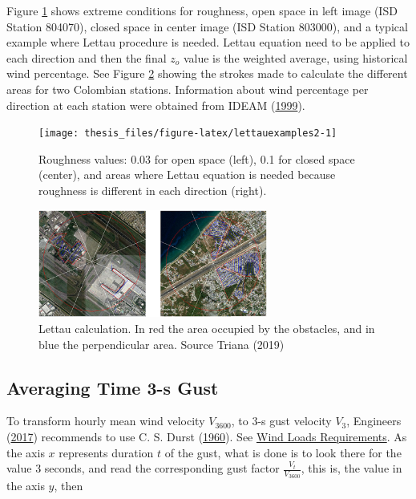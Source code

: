 \documentclass[12pt,oneside]{reedthesis}
\begin{document}
Figure \ref{fig:lettauexamples2} shows extreme conditions for roughness, open space in left image (ISD Station 804070), closed space in center image (ISD Station 803000), and a typical example where Lettau procedure is needed. Lettau equation need to be applied to each direction and then the final \(z_o\) value is the weighted average, using historical wind percentage. See Figure \ref{fig:lettauvalues} showing the strokes made to calculate the different areas for two Colombian stations. Information about wind percentage per direction at each station were obtained from IDEAM (\protect\hyperlink{ref-ideam1999}{1999}).
\begin{figure}

{\centering \texttt{[image: thesis\_files/figure-latex/lettauexamples2-1]} 

}

\caption{Roughness values: 0.03 for open space (left), 0.1 for closed space (center), and areas where Lettau equation is needed because roughness is different in each direction (right).}\label{fig:lettauexamples2}
\end{figure}
\begin{figure}

{\centering \includegraphics[width=2.97in]{figure/lettauvalues} 

}

\caption{Lettau calculation. In red the area occupied by the obstacles, and in blue the perpendicular area. Source Triana (2019)}\label{fig:lettauvalues}
\end{figure}
\hypertarget{rmd-gust}{%
\subsection{Averaging Time 3-s Gust}\label{rmd-gust}}

To transform hourly mean wind velocity \(V_{3600}\), to 3-s gust velocity \(V_3\), Engineers (\protect\hyperlink{ref-Asce2017}{2017}) recommends to use C. S. Durst (\protect\hyperlink{ref-Durst1960}{1960}). See \protect\hyperlink{windloadsrequirements}{Wind Loads Requirements}. As the axis \(x\) represents duration \(t\) of the gust, what is done is to look there for the value 3 seconds, and read the corresponding gust factor \(\frac{V_t}{V_{3600}}\), this is, the value in the axis \(y\), then
\end{document}
